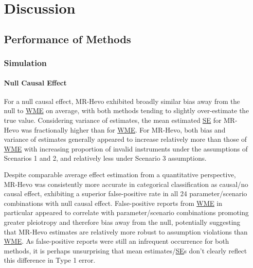 \documentclass[
]{article}
\begin{document}
\section{Discussion}\label{discussion}

\subsection{Performance of Methods}\label{performance-of-methods}

\subsubsection{Simulation}\label{simulation}

\paragraph{Null Causal Effect}\label{null-causal-effect}

\leavevmode\newline For a null causal effect, MR-Hevo exhibited broadly similar bias away from the null to \hyperref[acronyms_WME]{WME} on average, with both methods tending to slightly over-estimate the true value. Considering variance of estimates, the mean estimated \hyperref[acronyms_SE]{SE} for MR-Hevo was fractionally higher than for \hyperref[acronyms_WME]{WME}. For MR-Hevo, both bias and variance of estimates generally appeared to increase relatively more than those of \hyperref[acronyms_WME]{WME} with increasing proportion of invalid instruments under the assumptions of Scenarios 1 and 2, and relatively less under Scenario 3 assumptions.

Despite comparable average effect estimation from a quantitative perspective, MR-Hevo was consistently more accurate in categorical classification as causal/no causal effect, exhibiting a superior false-positive rate in all 24 parameter/scenario combinations with null causal effect. False-positive reports from \hyperref[acronyms_WME]{WME} in particular appeared to correlate with parameter/scenario combinations promoting greater pleiotropy and therefore bias away from the null, potentially suggesting that MR-Hevo estimates are relatively more robust to assumption violations than \hyperref[acronyms_WME]{WME}. As false-positive reports were still an infrequent occurrence for both methods, it is perhaps unsurprising that mean estimates/\hyperref[acronyms_SE]{SE}s don't clearly reflect this difference in Type 1 error.
\end{document}
